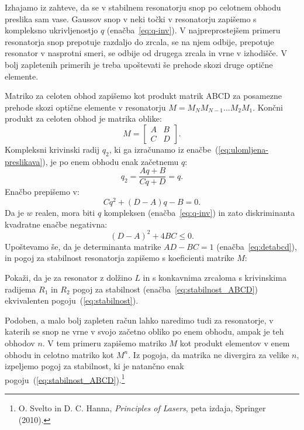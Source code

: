 Izhajamo iz zahteve, da se v stabilnem resonatorju snop po celotnem obhodu
preslika sam vase. Gaussov snop v neki točki v resonatorju 
zapišemo s kompleksno ukrivljenostjo $q$ (enačba~\ref{eq:q-inv}).
V najpreprostejšem primeru resonatorja snop prepotuje razdaljo do zrcala, se na njem 
odbije, prepotuje resonator v nasprotni smeri, se odbije od drugega zrcala in vrne 
v izhodišče. V bolj zapletenih primerih je treba upoštevati še 
prehode skozi druge optične elemente.

Matriko 
za celoten obhod zapišemo kot produkt matrik ABCD za posamezne prehode skozi 
optične elemente v resonatorju $M = M_N M_{N-1} ...M_2 M_1$.
Končni produkt za celoten obhod je matrika oblike:
\begin{equation}
M = \left[\begin{array}{cc}
A & B\\
C & D
\end{array}\right]\!\!.
\end{equation}
Kompleksni krivinski radij $q_2$, ki ga izračunamo iz enačbe~(\ref{eq:ulomljena-preslikava}), 
je po enem obhodu enak začetnemu $q$:
\begin{equation}
q_2 = \frac{Aq+B}{Cq+D} = q.
\end{equation}
Enačbo prepišemo v:
\begin{equation}
Cq^2+(D-A)q-B=0.
\end{equation}
Da je $w$ realen, mora biti $q$ kompleksen (enačba~\ref{eq:q-inv}) 
in zato diskriminanta kvadratne enačbe negativna:
\begin{equation}
(D-A)^2+ 4BC\leq 0.
\end{equation}
Upoštevamo še, da je determinanta matrike $AD-BC=1$ (enačba~\ref{eq:detabcd}), in pogoj za 
stabilnost resonatorja zapišemo s koeficienti matrike $M$:

\begin{naloga}
Pokaži, da je za resonator z dolžino $L$ in s konkavnima zrcaloma s krivinskima radijema $R_1$ in $R_2$ 
pogoj za stabilnost (enačba~\ref{eq:stabilnost_ABCD}) ekvivalenten pogoju~(\ref{eq:stabilnost}).
\end{naloga}

\begin{remark}
Podoben, a malo bolj zapleten račun lahko naredimo tudi za resonatorje, v katerih se snop 
ne vrne v svojo začetno obliko po enem obhodu, ampak je teh obhodov $n$. V tem primeru zapišemo
matriko $M$ kot produkt elementov v enem obhodu in celotno matriko kot $M^n$. Iz pogoja,
da matrika ne divergira za velike $n$, izpeljemo pogoj za stabilnost, ki je natančno 
enak pogoju~(\ref{eq:stabilnost_ABCD}).\footnote{O. Svelto in D. C. Hanna, 
{\it Principles of Lasers}, peta izdaja, Springer (2010).}
\end{remark}
\newpage

